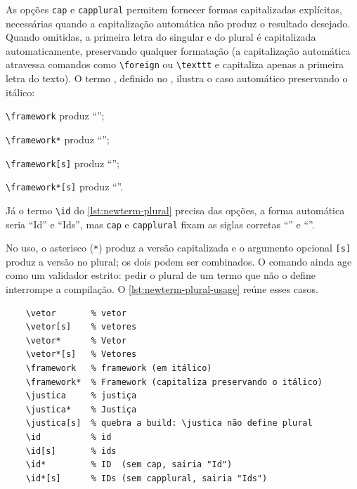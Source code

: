 As opções \texttt{cap} e \texttt{capplural} permitem fornecer formas capitalizadas explícitas, necessárias quando a capitalização automática não produz o resultado desejado. Quando omitidas, a primeira letra do singular e do plural é capitalizada automaticamente, preservando qualquer formatação (a capitalização automática atravessa comandos como \texttt{\textbackslash{}foreign} ou \texttt{\textbackslash{}texttt} e capitaliza apenas a primeira letra do texto).
O termo \framework, definido no \macrofile, ilustra o caso automático preservando o itálico:
\begin{alineas}
  \item \texttt{\textbackslash{}framework} produz \enquote{\framework};
  \item \texttt{\textbackslash{}framework*} produz \enquote{\framework*};
  \item \texttt{\textbackslash{}framework[s]} produz \enquote{\framework[s]};
  \item \texttt{\textbackslash{}framework*[s]} produz \enquote{\framework*[s]}.
\end{alineas}

Já o termo \texttt{\textbackslash{}id} do \autoref{lst:newterm-plural} precisa das opções, a forma automática seria \enquote{Id} e \enquote{Ids}, mas \texttt{cap} e \texttt{capplural} fixam as siglas corretas \enquote{\id*} e \enquote{\id*[s]}.

No uso, o asterisco (\texttt{*}) produz a versão capitalizada e o argumento opcional \texttt{[s]} produz a versão no plural; os dois podem ser combinados. O comando ainda age como um validador estrito: pedir o plural de um termo que não o define interrompe a compilação. O \autoref{lst:newterm-plural-usage} reúne esses casos.

\begin{listing}[htb]
  \begin{verbatim}
    \vetor       % vetor
    \vetor[s]    % vetores
    \vetor*      % Vetor
    \vetor*[s]   % Vetores
    \framework   % framework (em itálico)
    \framework*  % Framework (capitaliza preservando o itálico)
    \justica     % justiça
    \justica*    % Justiça
    \justica[s]  % quebra a build: \justica não define plural
    \id          % id
    \id[s]       % ids
    \id*         % ID  (sem cap, sairia "Id")
    \id*[s]      % IDs (sem capplural, sairia "Ids")
  \end{verbatim}
  \caption{Uso dos modificadores de plural e capitalização}
  \label{lst:newterm-plural-usage}
\end{listing}

